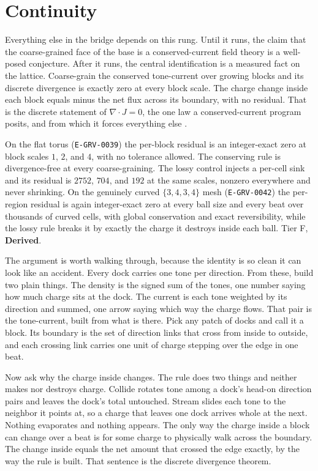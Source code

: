 \section{Continuity}

Everything else in the bridge depends on this rung. Until it runs, the claim that the
coarse-grained face of the base is a conserved-current field theory is a
well-posed conjecture. After it runs, the central identification is a measured
fact on the lattice. Coarse-grain the conserved
tone-current over growing blocks and its discrete divergence is exactly zero at
every block scale. The charge change inside each block equals minus the net flux
across its boundary, with no residual. That is the discrete statement of
$\nabla\!\cdot J = 0$, the one law a conserved-current program posits, and from
which it forces everything else \cite{herbert2025chronoflux}.

\begin{finding}
On the flat torus (\texttt{E-GRV-0039}) the per-block residual is an integer-exact zero
at block scales $1$, $2$, and $4$, with no tolerance allowed. The conserving
rule is divergence-free at every coarse-graining. The lossy control injects a
per-cell sink and its residual is $2752$, $704$, and $192$ at the same scales,
nonzero everywhere and never shrinking. On the genuinely curved $\{3,4,3,4\}$
mesh (\texttt{E-GRV-0042}) the per-region residual is again integer-exact zero at every
ball size and every beat over thousands of curved cells, with global
conservation and exact reversibility, while the lossy rule breaks it by exactly
the charge it destroys inside each ball. Tier F, \textbf{Derived}.
\end{finding}

The argument is worth walking through, because the identity is so clean it can
look like an accident. Every dock carries one tone per direction. From these,
build two plain things. The density is the signed sum of the tones, one number
saying how much charge sits at the dock. The current is each tone weighted by
its direction and summed, one arrow saying which way the charge flows.
That pair is the tone-current, built from what is there. Pick
any patch of docks and call it a block. Its boundary is the set of direction
links that cross from inside to outside, and each crossing link carries one unit
of charge stepping over the edge in one beat.

Now ask why the charge inside changes. The rule does two things and neither
makes nor destroys charge. Collide rotates tone among a dock's head-on
direction pairs and leaves the dock's total untouched. Stream slides each tone to
the neighbor it points at, so a charge that leaves one dock arrives whole at the
next. Nothing evaporates and nothing appears. The only way the charge inside a
block can change over a beat is for some charge to physically walk across the
boundary. The change inside equals the net amount that crossed the edge exactly,
by the way the rule is built. That sentence is the discrete
divergence theorem.

